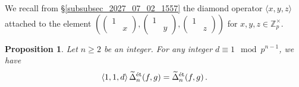 \documentclass{amsart}
\numberwithin{equation}{section}
\newtheorem{proposition}[theorem]{Proposition}
\newcommand{\ZZ}{\mathbb{Z}}
\newcommand{\etale}{\textup{\'et}}
\begin{document}
\subsubsection{}\label{sec:specialization} We recall from \S\ref{subsubsec_2027_07_02_1557} the diamond operator $\langle x, y, z \rangle$ attached to the element $\left(\left( \begin{smallmatrix}
    1 & \\ & x
\end{smallmatrix}\right),\left( \begin{smallmatrix}
    1 & \\ & y
\end{smallmatrix}\right),\left( \begin{smallmatrix}
    1 & \\ & z
\end{smallmatrix}\right)\right)$ for $x,y,z\in \ZZ_p^\times$. 
\begin{proposition}
        \label{prop_2025_03_08_1713}
Let $n\geq 2$ be an integer. For any integer $d\equiv 1 \mod p^{n-1}$, we have
    $$\langle 1,1,d\rangle\,\widetilde{\Delta}_{n}^{\etale}(f, g)=\widetilde{\Delta}_{n}^{\etale}(f,g)\,.$$
\end{proposition}
\end{document}
